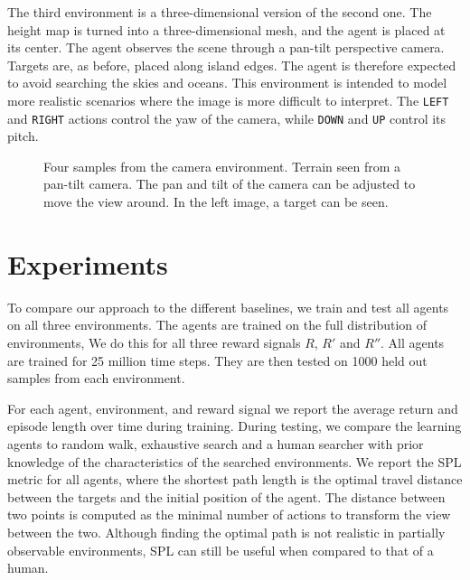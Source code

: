The third environment is a three-dimensional version of the second one.
The height map is turned into a three-dimensional mesh, and the agent is placed at its center.
The agent observes the scene through a pan-tilt perspective camera.
Targets are, as before, placed along island edges.
The agent is therefore expected to avoid searching the skies and oceans.
This environment is intended to model more realistic scenarios where the image is more difficult to interpret.
The \texttt{LEFT} and \texttt{RIGHT} actions control the yaw of the camera, while \texttt{DOWN} and \texttt{UP} control its pitch.

\begin{figure}
    \centering
    
    \label{fig:camera}
    \caption[Camera environment]{Four samples from the camera environment. Terrain seen from a pan-tilt camera. The pan and tilt of the camera can be adjusted to move the view around. In the left image, a target can be seen.}
\end{figure}

\section{Experiments}
\label{sec:experiments}


To compare our approach to the different baselines,
we train and test all agents on all three environments.
The agents are trained on the full distribution of environments,
We do this for all three reward signals \(R\), \(R'\) and \(R''\).
All agents are trained for 25 million time steps.
They are then tested on 1000 held out samples from each environment.

For each agent, environment, and reward signal we report the average return and episode length over time during training.
During testing, we compare the learning agents to random walk, exhaustive search and a human searcher with prior knowledge of the characteristics of the searched environments.
We report the SPL metric for all agents, where the shortest path length is the optimal travel distance between the targets and the initial position of the agent.
The distance between two points is computed as the minimal number of actions to transform the view between the two.
Although finding the optimal path is not realistic in partially observable environments, SPL can still be useful when compared to that of a human.

